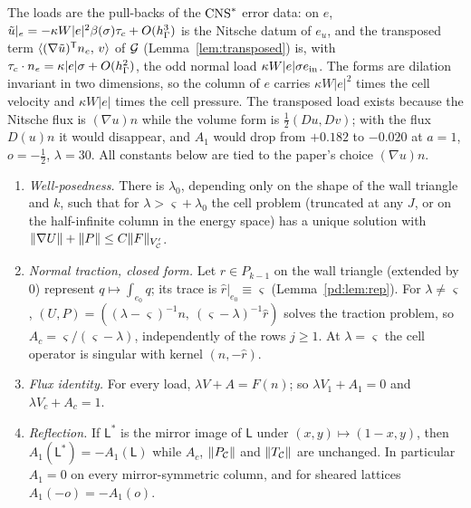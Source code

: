 The loads are the pull-backs of the $\mathrm{CNS}^\ast$ error data: on $e$, $\tilde u|_e=-\kappa W|e|^2\beta(\sigma)\tau_c+O(h_\Gamma^3)$ is the Nitsche datum of $e_u$, and the transposed term $\langle (\nabla\tilde u)^{\mathsf T}n_e,\, v\rangle$ of $\mathcal G$ (Lemma~\ref{lem:transposed}) is, with $\tau_c\cdot n_e=\kappa|e|\sigma+O(h_\Gamma^2)$, the odd normal load $\kappa W|e|\sigma e_{\rm in}$. The forms are dilation invariant in two dimensions, so the column of $e$ carries $\kappa W|e|^2$ times the cell velocity and $\kappa W|e|$ times the cell pressure. The transposed load exists because the Nitsche flux is $(\nabla u)n$ while the volume form is $\frac12(Du,Dv)$; with the flux $D(u)n$ it would disappear, and $A_1$ would drop from $+0.182$ to $-0.020$ at $a=1$, $o=-\frac12$, $\lambda=30$. All constants below are tied to the paper's choice $(\nabla u)n$.

\begin{proposition}\label{pd:prop:cell}
\begin{enumerate}[label=(\alph*)]
\item \emph{Well-posedness.} There is $\lambda_0$, depending only on the shape of the wall triangle and $k$, such that for $\lambda>\varsigma+\lambda_0$ the cell problem (truncated at any $J$, or on the half-infinite column in the energy space) has a unique solution with $\lVert \nabla U\rVert+\lVert P\rVert\le C\lVert F\rVert_{V_{\mathcal C}'}$.
\item \emph{Normal traction, closed form.} Let $\hat r\in P_{k-1}$ on the wall triangle (extended by $0$) represent $q\mapsto\int_{e_0}q$; its trace is $\hat r|_{e_0}\equiv\varsigma$ (Lemma~\ref{pd:lem:rep}). For $\lambda\ne\varsigma$, $(U,P)=((\lambda-\varsigma)^{-1}n,\ (\varsigma-\lambda)^{-1}\hat r)$ solves the traction problem, so $A_c=\varsigma/(\varsigma-\lambda)$, independently of the rows $j\ge1$. At $\lambda=\varsigma$ the cell operator is singular with kernel $(n,-\hat r)$.
\item \emph{Flux identity.} For every load, $\lambda V+A=F(n)$; so $\lambda V_1+A_1=0$ and $\lambda V_c+A_c=1$.
\item \emph{Reflection.} If $\mathsf L^\ast$ is the mirror image of $\mathsf L$ under $(x,y)\mapsto(1-x,y)$, then $A_1(\mathsf L^\ast)=-A_1(\mathsf L)$ while $A_c$, $\lVert P_{\mathcal C}\rVert$ and $\lVert T_{\mathcal C}\rVert$ are unchanged. In particular $A_1=0$ on every mirror-symmetric column, and for sheared lattices $A_1(-o)=-A_1(o)$.
\end{enumerate}
\end{proposition}

